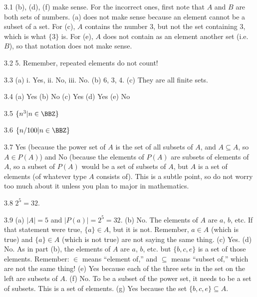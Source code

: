 \begin{RequAnswer}{3.1}
(b), (d), (f) make sense.
For the incorrect ones, first note that $A$ and $B$ are both sets of numbers.
(a) does not make sense because an element cannot be a subset of a set.
For (c), $A$ contains the number $3$, but not the set containing $3$,
which is what $\{3\}$ is.
For (e), $A$ does not contain as an element another set (i.e. $B$), so that notation does not
make sense.
\end{RequAnswer}
\begin{RequAnswer}{3.2}
5. Remember, repeated elements do not count!
\end{RequAnswer}
\begin{RequAnswer}{3.3}
(a) i. Yes, ii. No, iii. No.
(b) 6, 3, 4.
(c) They are all finite sets.
\end{RequAnswer}
\begin{RequAnswer}{3.4}
(a) Yes
(b) No
(c) Yes
(d) Yes
(e) No
\end{RequAnswer}
\begin{RequAnswer}{3.5}
$\{n^3 | n\in \BBZ\}$
\end{RequAnswer}
\begin{RequAnswer}{3.6}
$\{n/100 | n\in \BBZ\}$
\end{RequAnswer}
\begin{RequAnswer}{3.7}
Yes (because the power set of $A$ is the set of all subsets of $A$, and $A\subseteq A$, so $A\in P(A)$)
and No (because the elements of $P(A)$ are subsets of elements of $A$, so a subset of $P(A)$ would
be a set of subsets of $A$, but $A$ is a set of elements (of whatever type $A$ consists of).
This is a subtle point, so do not worry too much about it unless you plan to major in mathematics.
\end{RequAnswer}
\begin{RequAnswer}{3.8}
$2^5=32$.
\end{RequAnswer}
\begin{RequAnswer}{3.9}
(a) $|A|=5$ and $|P(a)|=2^5=32$.
(b) No. The elements of $A$ are $a$, $b$, etc.
If that statement were true, $\{a\}\in A$, but it is not. Remember, $a\in A$ (which is true) and
$\{a\}\in A$ (which is not true) are not saying the same thing.
(c) Yes.
(d) No. As in part (b), the elements of $A$ are $a$, $b$, etc. but $\{b,c,e\}$ is a set of those elements.
Remember: $\in$ means ``element of,'' and $\subseteq$ means ``subset of,'' which are not the same thing!
(e) Yes because each of the three sets in the set on the left are subsets of $A$.
(f) No. To be a subset of the power set, it needs to be a set of subsets. This is a set of elements.
(g) Yes because the set $\{b,c,e\}\subseteq A$.
\end{RequAnswer}
